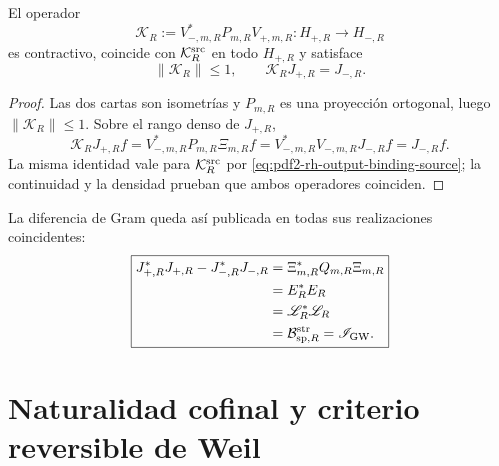 \begin{proposition}
\label{prop:pdf2-rh-conector}
El operador
\begin{equation}\label{eq:pdf2-rh-k-r}
 \mathcal K_R
 :=V_{-,m,R}^*P_{m,R}V_{+,m,R}:
 H_{+,R}\longrightarrow H_{-,R}
\end{equation}
es contractivo, coincide con \(\mathcal K_R^{\rm src}\) en todo
\(H_{+,R}\) y satisface
\begin{equation}\label{eq:pdf2-rh-k-binding}
 \|\mathcal K_R\|\leq1,
 \qquad
 \mathcal K_RJ_{+,R}=J_{-,R}.
\end{equation}
\end{proposition}

\begin{proof}
Las dos cartas son isometrías y \(P_{m,R}\) es una proyección ortogonal,
luego \(\|\mathcal K_R\|\leq1\). Sobre el rango denso de \(J_{+,R}\),
\[
 \mathcal K_RJ_{+,R}f
 =V_{-,m,R}^*P_{m,R}\Xi_{m,R}f
 =V_{-,m,R}^*V_{-,m,R}J_{-,R}f
 =J_{-,R}f.
\]
La misma identidad vale para \(\mathcal K_R^{\rm src}\) por
\eqref{eq:pdf2-rh-output-binding-source}; la continuidad y la densidad
prueban que ambos operadores coinciden.
\end{proof}

La diferencia de Gram queda así publicada en todas sus realizaciones
coincidentes:
\begin{equation}\label{eq:pdf2-rh-tres-publicaciones}
\boxed{
\begin{aligned}
 J_{+,R}^*J_{+,R}-J_{-,R}^*J_{-,R}
 &=\Xi_{m,R}^*Q_{m,R}\Xi_{m,R}\\
 &=E_R^*E_R\\
 &=\mathscr L_R^*\mathscr L_R\\
 &=\mathcal B_{{\rm sp},R}^{\rm str}=\mathscr I_{\rm GW}.
\end{aligned}}
\end{equation}

\section{Naturalidad cofinal y criterio reversible de Weil}

